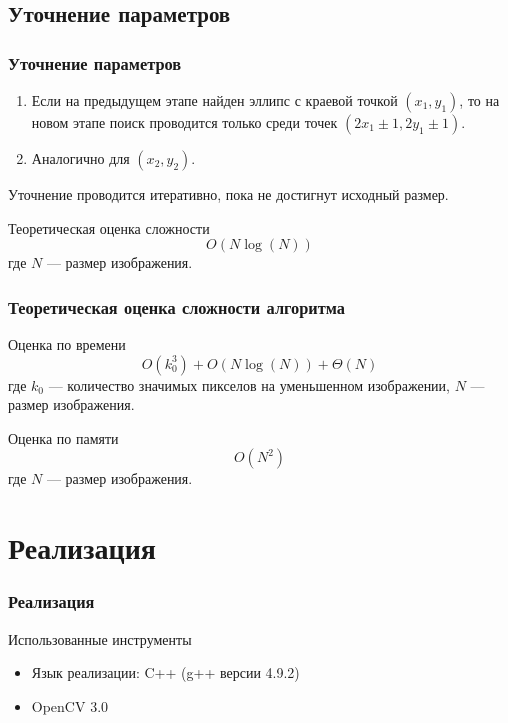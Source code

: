 \documentclass[14pt]{beamer}
\begin{document}
\subsection{Уточнение параметров}
\begin{frame}
\frametitle{Уточнение параметров}
\begin{block}{}
\begin{enumerate}
  \item Если на предыдущем этапе найден эллипс с краевой точкой \((x_1, y_1)\), то на новом этапе поиск проводится только среди точек \((2x_1 \pm 1, 2y_1 \pm 1)\).
  \item Аналогично для \((x_2, y_2)\).
\end{enumerate}
\end{block}
Уточнение проводится итеративно, пока не достигнут исходный размер.
\begin{block}{Теоретическая оценка сложности}
$$O(N\log(N))$$ где $N$ --- размер изображения.
\end{block}
\end{frame}


\begin{frame}
\frametitle{Теоретическая оценка сложности алгоритма}
\begin{block}{Оценка по времени}
$$O(k_0^3) + O(N\log(N)) + \Theta(N)$$ где $k_0$ --- количество значимых пикселов на уменьшенном изображении, $N$ --- размер изображения.
\end{block}
\begin{block}{Оценка по памяти}
$$O(N^2)$$ где $N$ --- размер изображения.
\end{block}
\end{frame}

\section{Реализация}
\begin{frame}
\frametitle{Реализация}
\begin{block}{Использованные инструменты}
\begin{itemize}
  \item Язык реализации: C++ (g++ версии 4.9.2)
  \item OpenCV 3.0
\end{itemize}
\end{block}
\end{frame}
\end{document}
